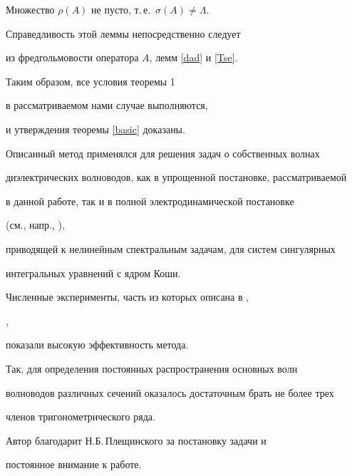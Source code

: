 \begin{lem}


\label{Cond6}


Множество $\rho(A)$ не пусто, т.\,е.~$\sigma(A)\ne \Lambda$.


\end{lem}





Справедливость этой леммы непосредственно следует


из фредгольмовости оператора $A$, лемм \ref{dad} и \ref{Tse}.





Таким образом, все условия теоремы 1 \cite{209611220014}


в рассматриваемом нами случае выполняются,


и утверждения теоремы \ref{basic} доказаны.





Описанный метод применялся для решения задач о собственных волнах


диэлектрических волноводов, как в упрощенной постановке, рассматриваемой 


в данной работе, так и в полной электродинамической постановке 


(см., напр., \cite{199603040005}),


приводящей к нелинейным спектральным задачам, для систем сингулярных


интегральных уравнений с ядром Коши.


Численные эксперименты, часть из которых описана в \cite{209612060002}, 


\cite{199708250005},


показали высокую эффективность метода.


Так, для определения постоянных распространения основных волн 


волноводов различных сечений оказалось достаточным брать не более трех


членов тригонометрического ряда. 





Автор благодарит Н.Б.\,Плещинского за постановку задачи и 


постоянное внимание к работе.





